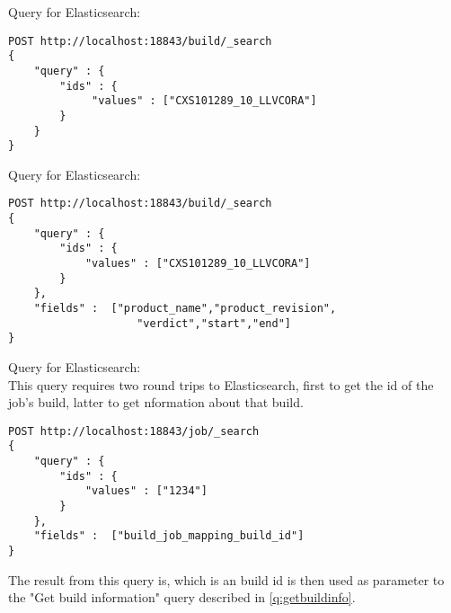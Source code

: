 \label{q:getbuildEs}
Query for Elasticsearch: \\
\begin{verbatim}
POST http://localhost:18843/build/_search
{ 
    "query" : {
        "ids" : { 
             "values" : ["CXS101289_10_LLVCORA"]
        }
    }
}
\end{verbatim}



\label{q:getbuildInfoEs}
Query for Elasticsearch:
\begin{verbatim}
POST http://localhost:18843/build/_search
{ 
    "query" : {
        "ids" : { 
            "values" : ["CXS101289_10_LLVCORA"]
        }
    },
    "fields" :  ["product_name","product_revision",
                    "verdict","start","end"]
}
\end{verbatim}


Query for Elasticsearch:\\
This query requires two round trips to Elasticsearch, first to get the id of the job's build, latter to get nformation about that build.\\
\begin{verbatim}
POST http://localhost:18843/job/_search
{ 
    "query" : {
        "ids" : { 
            "values" : ["1234"]
        }
    },
    "fields" :  ["build_job_mapping_build_id"]
}
\end{verbatim}
The result from this query is, which is an build id is then used as parameter to the "Get build information" query described in \ref{q:getbuildinfo}. 



